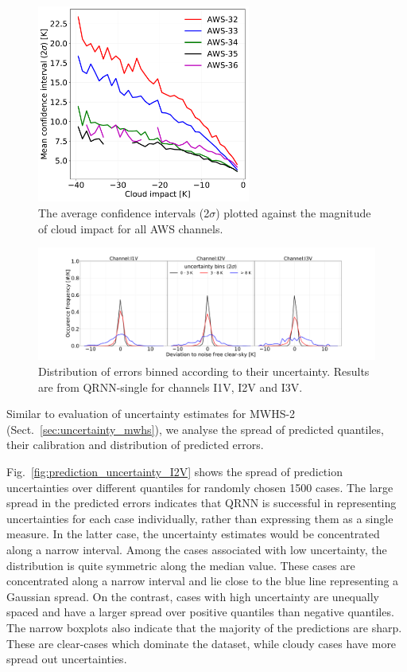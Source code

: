 \documentclass[amt, manuscript]{copernicus}
\begin{document}
\begin{figure}[t]
	\includegraphics[width = 70mm]{Figures/cloud_impact_uncertainty_AWS.pdf}	
	\caption{The average confidence intervals (2$\sigma$) plotted against the magnitude of cloud impact for all AWS channels.}
	\label{fig:uncertainty_cloud_impact}	
\end{figure}
\begin{figure}[t]
	\includegraphics[width=\textwidth]{Figures/PDF_uncertainty_bins_QRNN-single.pdf}	
	\caption{Distribution of errors binned according to their uncertainty. Results are from QRNN-single for channels I1V, I2V and I3V.}
	\label{fig:error_distribution_uncertainty_bins}	
\end{figure}

Similar to evaluation of uncertainty estimates for MWHS-2 (Sect.~\ref{sec:uncertainty_mwhs}), we analyse the spread of predicted quantiles, their calibration and distribution of predicted errors. 

Fig.~\ref{fig:prediction_uncertainty_I2V} shows the spread of prediction uncertainties over different quantiles for randomly chosen 1500 cases. The large spread in the predicted errors indicates that QRNN is successful in representing uncertainties for each case individually, rather than expressing them as a single measure. In the latter case, the uncertainty estimates would be concentrated along a narrow interval. Among the cases associated with low uncertainty, the distribution is quite symmetric along the median value. These cases are concentrated along a narrow interval and lie close to the blue line representing a Gaussian spread. On the contrast, cases with high uncertainty are unequally spaced and have a larger spread over positive quantiles than negative quantiles. The narrow boxplots also indicate that the majority of the predictions are sharp. These are clear-cases which dominate the dataset, while cloudy cases have more spread out uncertainties. 
\end{document}
